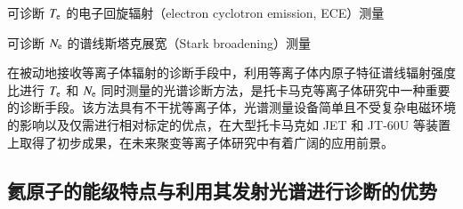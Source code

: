 
\hspace{0.25em}\textbullet\hspace{0.45em}可诊断 $T_{\rm e}$ 的电子回旋辐射（electron cyclotron emission, ECE）测量\cite{ECE:physics}

\hspace{0.25em}\textbullet\hspace{0.45em}可诊断 $N_{\rm e}$ 的谱线斯塔克展宽（Stark broadening）测量\cite{Stark-broadening}


在被动地接收等离子体辐射的诊断手段中，利用等离子体内原子特征谱线辐射强度比进行 $T_{\rm e}$ 和 $N_{\rm e}$ 同时测量的光谱诊断方法，是托卡马克等离子体研究中一种重要的诊断手段。该方法具有不干扰等离子体，光谱测量设备简单且不受复杂电磁环境的影响以及仅需进行相对标定的优点\cite{boivin2001,xie:wlxb}，在大型托卡马克如 JET\cite{Davies1997-HeBES-JET} 和 JT-60U\cite{Hirotaka1999-HeCRM-JT60U} 等装置上取得了初步成果，在未来聚变等离子体研究中有着广阔的应用前景。



\subsection{氦原子的能级特点与利用其发射光谱进行诊断的优势}

